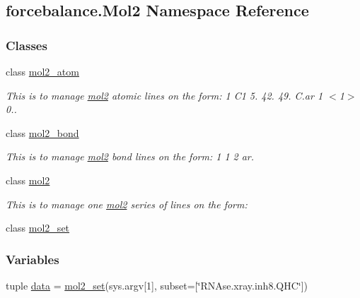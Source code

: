 \hypertarget{namespaceforcebalance_1_1Mol2}{\subsection{forcebalance.\-Mol2 Namespace Reference}
\label{namespaceforcebalance_1_1Mol2}
}
\subsubsection*{Classes}
\begin{DoxyCompactItemize}
\item 
class \hyperlink{classforcebalance_1_1Mol2_1_1mol2__atom}{mol2\-\_\-atom}
\begin{DoxyCompactList}\small\item\em This is to manage \hyperlink{classforcebalance_1_1Mol2_1_1mol2}{mol2} atomic lines on the form\-: 1 C1 5. 42. 49. C.\-ar 1 $<$1$>$ 0.. \end{DoxyCompactList}\item 
class \hyperlink{classforcebalance_1_1Mol2_1_1mol2__bond}{mol2\-\_\-bond}
\begin{DoxyCompactList}\small\item\em This is to manage \hyperlink{classforcebalance_1_1Mol2_1_1mol2}{mol2} bond lines on the form\-: 1 1 2 ar. \end{DoxyCompactList}\item 
class \hyperlink{classforcebalance_1_1Mol2_1_1mol2}{mol2}
\begin{DoxyCompactList}\small\item\em This is to manage one \hyperlink{classforcebalance_1_1Mol2_1_1mol2}{mol2} series of lines on the form\-: \end{DoxyCompactList}\item 
class \hyperlink{classforcebalance_1_1Mol2_1_1mol2__set}{mol2\-\_\-set}
\end{DoxyCompactItemize}
\subsubsection*{Variables}
\begin{DoxyCompactItemize}
\item 
tuple \hyperlink{namespaceforcebalance_1_1Mol2_aa0ea6835b13b32f3c9dafbfc769fceda}{data} = \hyperlink{classforcebalance_1_1Mol2_1_1mol2__set}{mol2\-\_\-set}(sys.\-argv\mbox{[}1\mbox{]}, subset=\mbox{[}\char`\"{}R\-N\-Ase.\-xray.\-inh8.\-Q\-H\-C\char`\"{}\mbox{]})
\end{DoxyCompactItemize}


